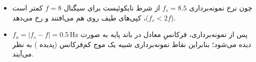 \begin{itemize}
    \item[(الف)] چون نرخ نمونه‌برداری $f_s=8.5$ از شرط نایکوئیست برای سیگنال $f=8$ کمتر است ($f_s<2f$)، کپی‌های طیف روی هم می‌افتند و  رخ می‌دهد.
    \item[(ب)] پس از نمونه‌برداری، فرکانسِ معادل در باند پایه به صورت $f_a=\lvert f_s-f\rvert=0.5\,\text{Hz}$ دیده می‌شود؛ بنابراین نقاط نمونه‌برداری شبیه یک موج کم‌فرکانس (پدیده ) به نظر می‌آیند.
\end{itemize}
